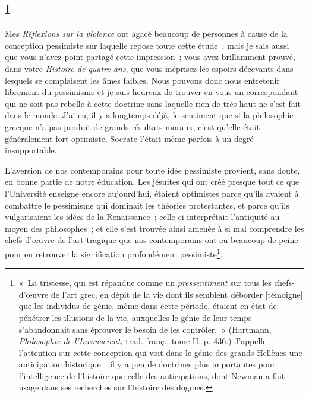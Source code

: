 \documentclass[french,twoside]{book} %
\begin{document}
\subsection[{I}]{I}
\noindent Mes \emph{Réflexions sur la violence} ont agacé beaucoup de personnes à cause de la conception pessimiste sur laquelle repose toute cette étude ; mais je sais aussi que vous n’avez point partagé cette impression ; vous avez brillamment prouvé, dans votre \emph{Histoire de quatre ans}, que vous méprisez les espoirs décevants dans lesquels se complaisent les âmes faibles. Nous pouvons donc nous entretenir librement du pessimisme et je suis heureux de trouver en vous un correspondant qui ne soit pas rebelle à cette doctrine sans laquelle rien de très haut ne s’est fait dans le monde. J’ai eu, il y a longtemps déjà, le sentiment que si la philosophie grecque n’a pas produit de grands résultats moraux, c’est qu’elle était généralement fort optimiste. Socrate l’était même parfois à un degré insupportable.\par
L’aversion de nos contemporains pour toute idée pessimiste provient, sans doute, en bonne partie de notre éducation. Les jésuites qui ont créé presque tout ce que  l’Université enseigne encore aujourd’hui, étaient optimistes parce qu’ils avaient à combattre le pessimisme qui dominait les théories protestantes, et parce qu’ils vulgarisaient les idées de la Renaissance ; celle-ci interprétait l’antiquité au moyen des philosophes ; et elle s’est trouvée ainsi amenée à si mal comprendre les chefs-d’œuvre de l’art tragique que nos contemporains ont eu beaucoup de peine pour en retrouver la signification profondément pessimiste\footnote{ \noindent « La tristesse, qui est répandue comme un \emph{pressentiment} sur tous les chefs-d’œuvre de l’art grec, en dépit de la vie dont ils semblent déborder [témoigne] que les individus de génie, même dans cette période, étaient en état de pénétrer les illusions de la vie, auxquelles le génie de leur temps s’abandonnait sans éprouver le besoin de les contrôler. » (Hartmann, \emph{Philosophie de l’Inconscient,} trad. franç., tome II, p. 436.) J’appelle l’attention sur cette conception qui voit dans le génie des grands Hellènes une anticipation historique : il y a peu de doctrines plus importantes pour l’intelligence de l’histoire que celle des anticipations, dont Newman a fait usage dans ses recherches sur l’histoire des dogmes.
 }.\par
\end{document}
